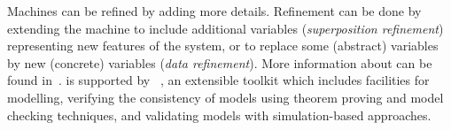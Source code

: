 Machines can be refined by adding more details.  Refinement can be done by extending the machine to include additional variables (\emph{superposition refinement}) representing new features of the system, or to replace some (abstract) variables by new (concrete) variables (\emph{data refinement}).  More information about \EventB can be found in~\cite{hoang13:_introd_event_b_model_method}.  \EventB is supported by \Rodin~\cite{abrial10:_rodin}, an extensible toolkit which includes facilities for modelling, verifying the consistency of models using theorem proving and model checking techniques, and validating models with simulation-based approaches.

